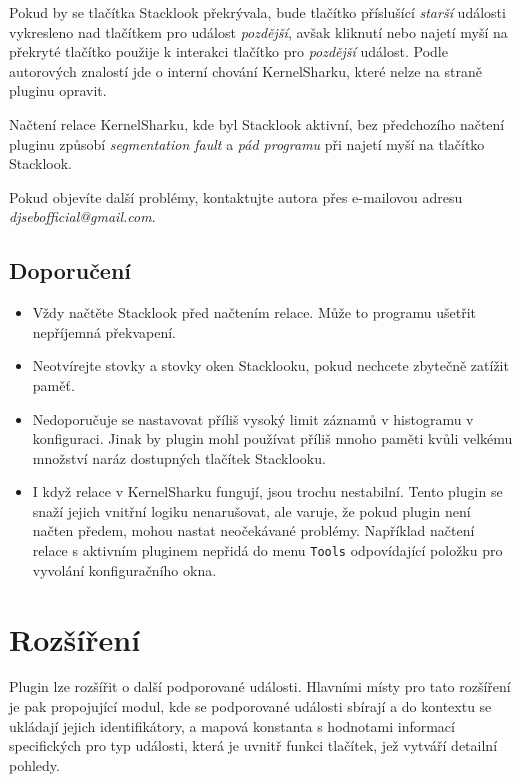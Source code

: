 Pokud by se tlačítka Stacklook překrývala, bude tlačítko příslušící \emph{starší} události vykresleno nad tlačítkem pro událost \emph{pozdější}, avšak kliknutí nebo najetí myší na překryté tlačítko použije k interakci tlačítko pro \emph{pozdější} událost. Podle autorových znalostí jde o interní chování KernelSharku, které nelze na straně pluginu opravit.

Načtení relace KernelSharku, kde byl Stacklook aktivní, bez předchozího načtení pluginu způsobí \emph{segmentation fault} a \emph{pád programu} při najetí myší na tlačítko Stacklook.

Pokud objevíte další problémy, kontaktujte autora přes e-mailovou adresu \emph{djsebofficial@gmail.com}.

\subsection{Doporučení}

\begin{itemize}
  \item Vždy načtěte Stacklook před načtením relace. Může to programu ušetřit nepříjemná překvapení.
  \item Neotvírejte stovky a stovky oken Stacklooku, pokud nechcete zbytečně zatížit paměť.
  \item Nedoporučuje se nastavovat příliš vysoký limit záznamů v histogramu v konfiguraci. Jinak by plugin mohl používat příliš mnoho paměti kvůli velkému množství naráz dostupných tlačítek Stacklooku.
  \item I když relace v KernelSharku fungují, jsou trochu nestabilní. Tento plugin se snaží jejich vnitřní logiku nenarušovat, ale varuje, že pokud plugin není načten předem, mohou nastat neočekávané problémy. Například načtení relace s aktivním pluginem nepřidá do menu \texttt{Tools} odpovídající položku pro vyvolání konfiguračního okna.
\end{itemize}

\section{Rozšíření}

Plugin lze rozšířit o další podporované události. Hlavními místy pro tato rozšíření je pak propojující modul, kde se podporované události sbírají a do kontextu se ukládají jejich identifikátory, a mapová konstanta s hodnotami informací specifických pro typ události, která je uvnitř funkci tlačítek, jež vytváří detailní pohledy.